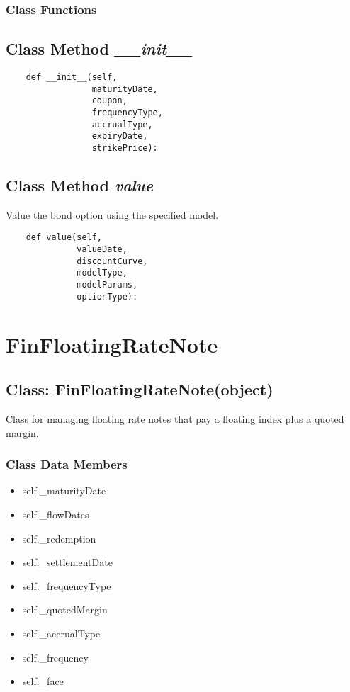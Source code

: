 \documentclass[twoside,11pt]{book}
\begin{document}
\subsubsection{Class Functions}

\subsection{Class Method {\it \_\_init\_\_}}


\begin{lstlisting}
    def __init__(self,
                 maturityDate, 
                 coupon,
                 frequencyType,
                 accrualType,
                 expiryDate, 
                 strikePrice):
\end{lstlisting}

\subsection{Class Method {\it value}}
Value the bond option using the specified model. 

\begin{lstlisting}
    def value(self,
              valueDate,
              discountCurve,
              modelType,
              modelParams,
              optionType):
\end{lstlisting}

\newpage
\section{FinFloatingRateNote}

\subsection{Class: FinFloatingRateNote(object)}
Class for managing floating rate notes that pay a floating index plus a quoted margin.

\subsubsection{Class Data Members}
\begin{itemize}
\item{self.\_maturityDate}
\item{self.\_flowDates}
\item{self.\_redemption}
\item{self.\_settlementDate}
\item{self.\_frequencyType}
\item{self.\_quotedMargin}
\item{self.\_accrualType}
\item{self.\_frequency}
\item{self.\_face}
\end{itemize}
\end{document}
